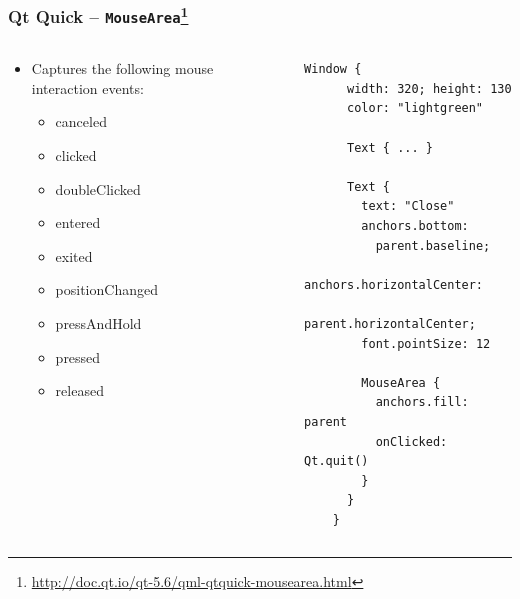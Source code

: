 \begin{frame}[fragile]
  \frametitle{Qt Quick -- \texttt{MouseArea}\footnote
    {\url{http://doc.qt.io/qt-5.6/qml-qtquick-mousearea.html}}}
  \begin{columns}
    \begin{column}{0.5\textwidth}
    \begin{itemize}
      \item Captures the following mouse interaction events:
      \begin{itemize}
        \small
        \item canceled
        \item clicked
        \item doubleClicked
        \item entered
        \item exited
        \item positionChanged
        \item pressAndHold
        \item pressed
        \item released
      \end{itemize}
    \end{itemize}
    \end{column}
    \begin{column}{0.5\textwidth}
      \begin{lstlisting}[basicstyle=\tiny\ttfamily]
	Window {
	  width: 320; height: 130
	  color: "lightgreen"

	  Text { ... }

	  Text {
	    text: "Close"
	    anchors.bottom:
	      parent.baseline;
	    anchors.horizontalCenter:
	      parent.horizontalCenter;
	    font.pointSize: 12

	    MouseArea {
	      anchors.fill: parent
	      onClicked: Qt.quit()
	    }
	  }
	}
      \end{lstlisting}
    \end{column}
  \end{columns}
\end{frame}

